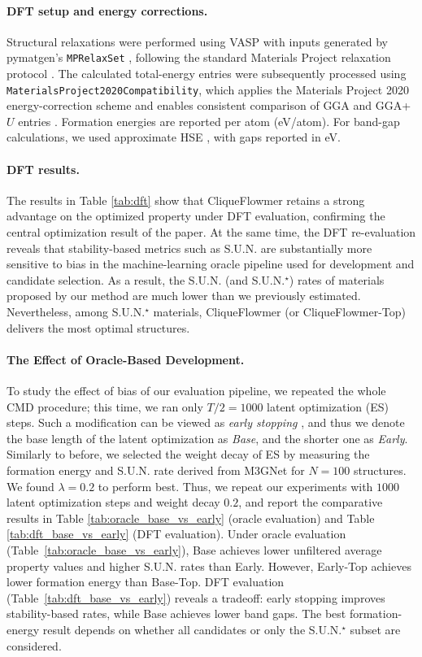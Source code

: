 \documentclass{article}
\theoremstyle{plain}
\theoremstyle{definition}
\theoremstyle{remark}
\begin{document}
\paragraph{DFT setup and energy corrections.}
Structural relaxations were performed using VASP \citep{kresse1996efficiency,kresse1996efficient} with inputs generated by pymatgen's \texttt{MPRelaxSet} \citep{ong2013python}, following the standard Materials Project relaxation protocol \citep{jain2013commentary}. The calculated total-energy entries were subsequently processed using \texttt{MaterialsProject2020Compatibility}, which applies the Materials Project 2020 energy-correction scheme and enables consistent comparison of GGA and GGA+$U$ entries \citep{wang2021framework,jain2011formation}. Formation energies are reported per atom (eV/atom). For band-gap calculations, we used approximate HSE \citep{heyd2003hse}, with gaps reported in eV.

\paragraph{DFT results.}
The results in Table \ref{tab:dft} show that CliqueFlowmer retains a strong advantage on the optimized property under DFT evaluation, confirming the central optimization result of the paper. At the same time, the DFT re-evaluation reveals that stability-based metrics such as S.U.N. are substantially more sensitive to bias in the machine-learning oracle pipeline used for development and candidate selection.
As a result, the S.U.N. (and S.U.N.$^\star$) rates of materials proposed by our method are much lower than we previously estimated.
Nevertheless, among S.U.N.$^\star$ materials, CliqueFlowmer (or CliqueFlowmer-Top) delivers the most optimal structures.

\paragraph{The Effect of Oracle-Based Development.}
To study the effect of bias of our evaluation pipeline, we repeated the whole CMD procedure; this time, we ran only $T/2=1000$ latent optimization (ES) steps.
Such a modification can be viewed as \emph{early stopping} \citep{prechelt2002early}, and thus we denote the base length of the latent optimization as \emph{Base}, and the shorter one as \emph{Early}.
Similarly to before, we selected the weight decay of ES by measuring the formation energy and S.U.N. rate derived from M3GNet for $N=100$ structures. 
We found $\lambda=0.2$ to perform best. 
Thus, we repeat our experiments with $1000$ latent optimization steps and weight decay $0.2$, and report the comparative results in Table \ref{tab:oracle_base_vs_early} (oracle evaluation) and Table \ref{tab:dft_base_vs_early} (DFT evaluation).
Under oracle evaluation (Table~\ref{tab:oracle_base_vs_early}), Base achieves lower unfiltered average property values and higher S.U.N. rates than Early. However, Early-Top achieves lower formation energy than Base-Top. DFT evaluation (Table~\ref{tab:dft_base_vs_early}) reveals a tradeoff: early stopping improves stability-based rates, while Base achieves lower band gaps. The best formation-energy result depends on whether all candidates or only the S.U.N.$^\star$ subset are considered.
\end{document}
